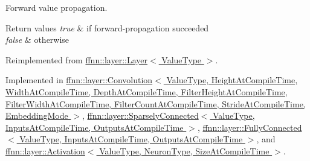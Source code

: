 Forward value propagation. 


\begin{DoxyRetVals}{Return values}
{\em true} & if forward-\/propagation succeeded \\
\hline
{\em false} & otherwise \\
\hline
\end{DoxyRetVals}


Reimplemented from \hyperlink{classffnn_1_1layer_1_1_layer_a832518de9beb442be0764e49ab24d78d}{ffnn\-::layer\-::\-Layer$<$ Value\-Type $>$}.



Implemented in \hyperlink{classffnn_1_1layer_1_1_convolution_a5abc1ff3fb9aadcb18446fa7cdcfee5f}{ffnn\-::layer\-::\-Convolution$<$ Value\-Type, Height\-At\-Compile\-Time, Width\-At\-Compile\-Time, Depth\-At\-Compile\-Time, Filter\-Height\-At\-Compile\-Time, Filter\-Width\-At\-Compile\-Time, Filter\-Count\-At\-Compile\-Time, Stride\-At\-Compile\-Time, Embedding\-Mode $>$}, \hyperlink{classffnn_1_1layer_1_1_sparsely_connected_a53f1d9a2edfdd2e47164b24121c23acc}{ffnn\-::layer\-::\-Sparsely\-Connected$<$ Value\-Type, Inputs\-At\-Compile\-Time, Outputs\-At\-Compile\-Time $>$}, \hyperlink{classffnn_1_1layer_1_1_fully_connected_ac49087ab2d66019f2d0244c76987fa50}{ffnn\-::layer\-::\-Fully\-Connected$<$ Value\-Type, Inputs\-At\-Compile\-Time, Outputs\-At\-Compile\-Time $>$}, and \hyperlink{classffnn_1_1layer_1_1_activation_aa7f88c8bc20589dc51d9dd615b8c4580}{ffnn\-::layer\-::\-Activation$<$ Value\-Type, Neuron\-Type, Size\-At\-Compile\-Time $>$}.

